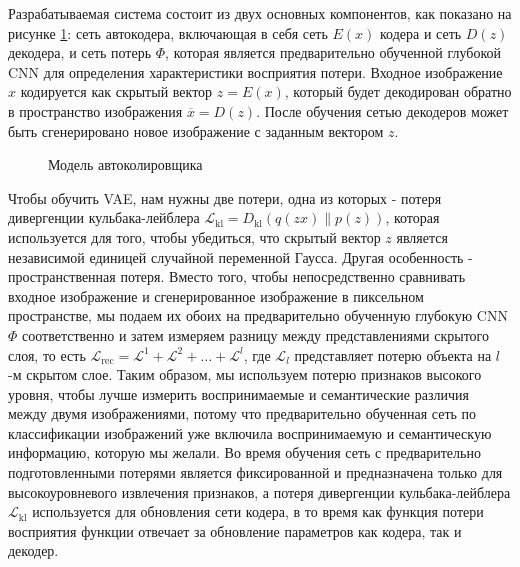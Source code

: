 Разрабатываемая система состоит из двух основных компонентов, как показано на рисунке \ref{fig:autoencoder}: сеть автокодера, включающая в себя сеть $E(x)$ кодера и сеть $D(z)$ декодера, и сеть потерь $\Phi$, которая является предварительно обученной глубокой CNN для определения характеристики восприятия потери. Входное изображение $x$ кодируется как скрытый вектор $z=E(x)$, который будет декодирован обратно в пространство изображения $\overline{x}= D(z)$. После обучения сетью декодеров может быть сгенерировано новое изображение с заданным вектором $z$. 
 \begin{figure}[H]
 	\caption{Модель автоколировщика}
 	\label{fig:autoencoder}
 \end{figure}

Чтобы обучить VAE, нам нужны две потери, одна из которых - потеря дивергенции кульбака-лейблера $\mathcal{L}_{\text{kl}} = D_{\text{kl}} (q (zx) \| p(z))$, которая используется для того, чтобы убедиться, что скрытый вектор $z$ является независимой единицей случайной переменной Гаусса. Другая особенность - пространственная потеря. Вместо того, чтобы непосредственно сравнивать входное изображение и сгенерированное изображение в пиксельном пространстве, мы подаем их обоих на предварительно обученную глубокую CNN $\Phi$ соответственно и затем измеряем разницу между представлениями скрытого слоя, то есть $\mathcal{L}_{\text{rec}} = \mathcal{L}^1 + \mathcal{L}^2 + \dots + \mathcal{L}^l$, где $\mathcal{L}_l$ представляет потерю объекта на $l$-м скрытом слое. Таким образом, мы используем потерю признаков высокого уровня, чтобы лучше измерить воспринимаемые и семантические различия между двумя изображениями, потому что предварительно обученная сеть по классификации изображений уже включила воспринимаемую и семантическую информацию, которую мы желали. Во время обучения сеть с предварительно подготовленными потерями является фиксированной и предназначена только для высокоуровневого извлечения признаков, а потеря дивергенции кульбака-лейблера $\mathcal{L}_{\text{kl}}$ используется для обновления сети кодера, в то время как функция потери восприятия функции отвечает за обновление параметров как кодера, так и декодер.

